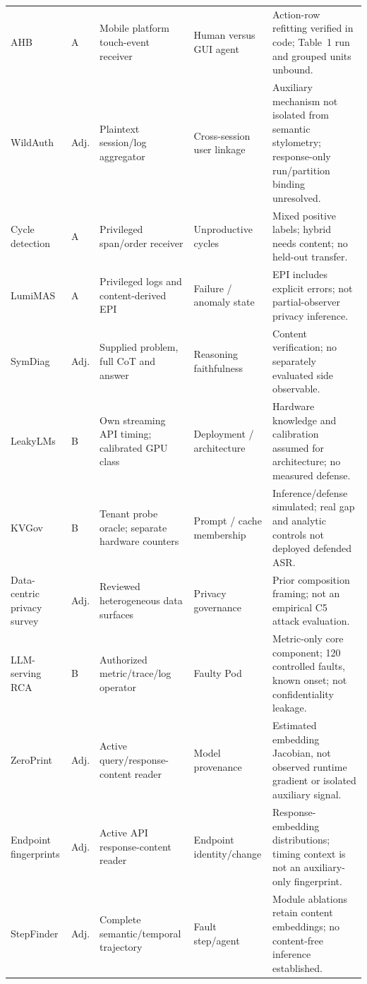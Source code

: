 \begin{table}[!t]
\begin{tabularx}{\textwidth}{@{}>{\raggedright\arraybackslash}p{}>{\raggedright\arraybackslash}p{}>{\raggedright\arraybackslash}p{}>{\raggedright\arraybackslash}p{}Y@{}}
AHB \cite{zhu2026turing} & A & Mobile platform touch-event receiver & Human versus GUI agent & Action-row refitting verified in code; Table~1 run and grouped units unbound. \\
WildAuth \cite{wang2026dialogue} & Adj. & Plaintext session/log aggregator & Cross-session user linkage & Auxiliary mechanism not isolated from semantic stylometry; response-only run/partition binding unresolved. \\
Cycle detection\newline \cite{george2025cycles} & A & Privileged span/order receiver & Unproductive cycles & Mixed positive labels; hybrid needs content; no held-out transfer. \\
LumiMAS \cite{solomon2026lumimas} & A & Privileged logs and content-derived EPI & Failure / anomaly state & EPI includes explicit errors; not partial-observer privacy inference. \\
SymDiag \cite{cui2026symdiag} & Adj. & Supplied problem, full CoT and answer & Reasoning faithfulness & Content verification; no separately evaluated side observable. \\
LeakyLMs \cite{majidi2026leakylms} & B & Own streaming API timing; calibrated GPU class & Deployment / architecture & Hardware knowledge and calibration assumed for architecture; no measured defense. \\
KVGov \cite{addagada2026kvgov} & B & Tenant probe oracle; separate hardware counters & Prompt / cache membership & Inference/defense simulated; real gap and analytic controls not deployed defended ASR. \\
Data-centric privacy survey \cite{lahjouji2026datacentric} & Adj. & Reviewed heterogeneous data surfaces & Privacy governance & Prior composition framing; not an empirical C5 attack evaluation. \\
LLM-serving RCA \cite{scheinert2026rca} & B & Authorized metric/trace/log operator & Faulty Pod & Metric-only core component; 120 controlled faults, known onset; not confidentiality leakage. \\
ZeroPrint \cite{shao2026zeroprint} & Adj. & Active query/response-content reader & Model provenance & Estimated embedding Jacobian, not observed runtime gradient or isolated auxiliary signal. \\
Endpoint fingerprints \cite{leshin2026endpoint} & Adj. & Active API response-content reader & Endpoint identity/change & Response-embedding distributions; timing context is not an auxiliary-only fingerprint. \\
StepFinder \cite{zhu2026stepfinder} & Adj. & Complete semantic/temporal trajectory & Fault step/agent & Module ablations retain content embeddings; no content-free inference established. \\
\bottomrule
\end{tabularx}
\end{table}
